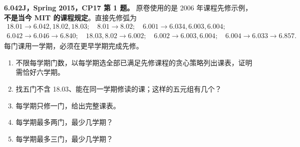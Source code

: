 \begin{exercise}\label{mit:6042-cp17-q1}
\textbf{6.042J，Spring 2015，CP17 第 1 题。}
原卷使用的是 2006 年课程先修示例，\textbf{不是当今 MIT 的课程规定}。直接先修弧为
\[
\begin{gathered}
18.01\to6.042,18.02,18.03;\quad8.01\to8.02;\quad6.001\to6.034,6.003,6.004;\\
6.042\to6.046\to6.840;\quad18.03,8.02\to6.002;\quad
6.002\to6.003,6.004;\quad6.004\to6.033\to6.857.
\end{gathered}
\]
每门课用一学期，必须在更早学期完成先修。
\begin{enumerate}[label=(\alph*)]
\item 不限每学期门数，以每学期选全部已满足先修课程的贪心策略列出课表，证明需恰好六学期。
\item 找五门不含 18.03、能在同一学期修读的课；这样的五元组有几个？
\item 每学期只修一门，给出完整课表。
\item 每学期最多两门，最少几学期？
\item 每学期最多三门，最少几学期？
\end{enumerate}
\end{exercise}
